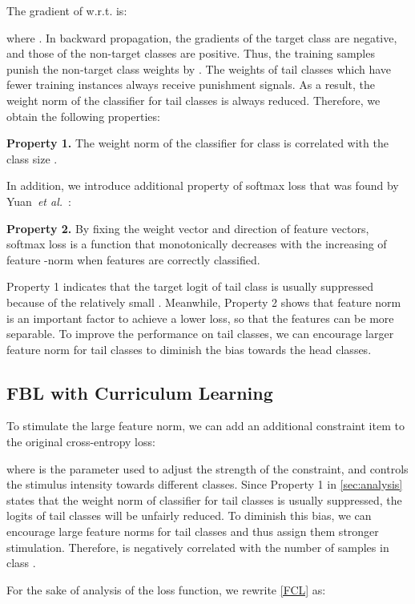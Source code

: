 \documentclass{article}
\def\wrt{w.r.t. } \def\dof{d.o.f\onedot}
\def\etal{\emph{et al.}}
\begin{document}
The gradient of  \wrt  is:

where . In backward propagation, the gradients of the target class are negative, and those of the non-target classes are positive. Thus, the training samples punish the non-target class weights  by . The weights of tail classes which have fewer training instances always receive punishment signals. As a result, the weight norm of the classifier for tail classes is always reduced. Therefore, we obtain the following properties:



\noindent\textbf{Property 1.} The weight norm  of the classifier for class  is correlated with the class size .

In addition, we introduce additional property of softmax loss that was found by Yuan~\etal~\cite{Yuan18feature}:

\noindent \textbf{Property 2.} By fixing the weight vector and direction of feature vectors, softmax loss is a function that monotonically decreases with the increasing of feature -norm when features are correctly classified.

Property 1 indicates that the target logit  of tail class is usually suppressed because of the relatively small .
Meanwhile, Property 2 shows that feature norm is an important factor to achieve a lower loss, so that the features can be more separable. To improve the performance on tail classes, we can encourage larger feature norm for tail classes to diminish the bias towards the head classes.

\subsection{FBL with Curriculum Learning}
To stimulate the large feature norm, we can add an additional constraint item to the original cross-entropy loss:

where  is the parameter used to adjust the strength of the constraint, and  controls the stimulus intensity towards different classes. Since Property 1 in \cref{sec:analysis} states that the weight norm of classifier for tail classes is usually suppressed, the logits of tail classes will be unfairly reduced. To diminish this bias, we can encourage large feature norms for tail classes and thus assign them stronger stimulation. Therefore,  is negatively correlated with the number of samples in class .

For the sake of analysis of the loss function, we rewrite \cref{FCL} as:
\end{document}
